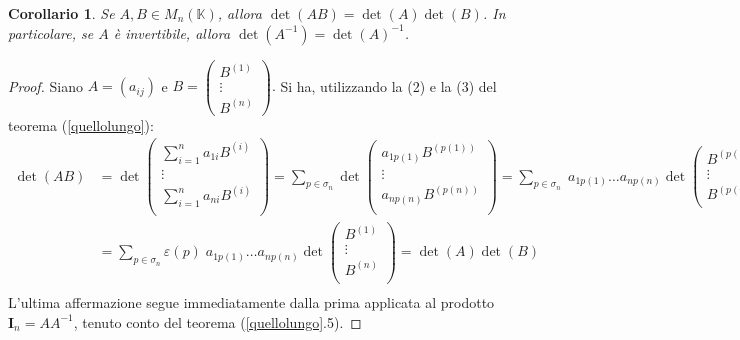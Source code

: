 \documentclass{article}
\theoremstyle{plain}
\newtheorem{cor}{Corollario}
\theoremstyle{definition}
\theoremstyle{remark}
\begin{document}
\begin{bxthm}
\begin{cor}\label{seitre}
    Se $A,B\in M_n(\mathbb{K})$, allora $\det(AB)=\det(A)\det(B)$. 
    In particolare, se $A$ è invertibile, allora $\det(A^{-1})=\det(A)^{-1}$.
\end{cor}
\end{bxthm}
\begin{proof}
    Siano $A=(a_{ij})$ e $B=\begin{pmatrix}
        B^{(1)}\\
        \vdots\\
        B^{(n)}
    \end{pmatrix}.$
    Si ha, utilizzando la (2) e la (3) del teorema (\ref{quellolungo}): 
    \begin{align*}
        \det(AB)&=\det\begin{pmatrix}
            \sum\limits_{i=1}^{n}a_{1i}B^{(i)}\\
            \vdots\\
            \sum\limits_{i=1}^{n}a_{ni}B^{(i)}\\
        \end{pmatrix}=\sum_{p\in\sigma_n}\det\begin{pmatrix}
            a_{1p(1)}B^{(p(1))}\\
            \vdots\\
            a_{np(n)}B^{(p(n))}\\
        \end{pmatrix}=\sum_{p\in\sigma_n}\;a_{1p(1)}\dots a_{np(n)}\det\begin{pmatrix}
            B^{(p(1))}\\
            \vdots\\
            B^{(p(n))}\\
        \end{pmatrix}=\\
        &=\sum_{p\in\sigma_n}\varepsilon(p)\;a_{1p(1)}\dots a_{np(n)}\det\begin{pmatrix}
            B^{(1)}\\
            \vdots\\
            B^{(n)}\\
        \end{pmatrix}=\det(A)\det(B)\\
    \end{align*}
    L'ultima affermazione segue immediatamente dalla prima applicata al prodotto $\mathbf{I}_n=AA^{-1}$, tenuto conto del teorema (\ref{quellolungo}.5).
\end{proof}
\end{document}
